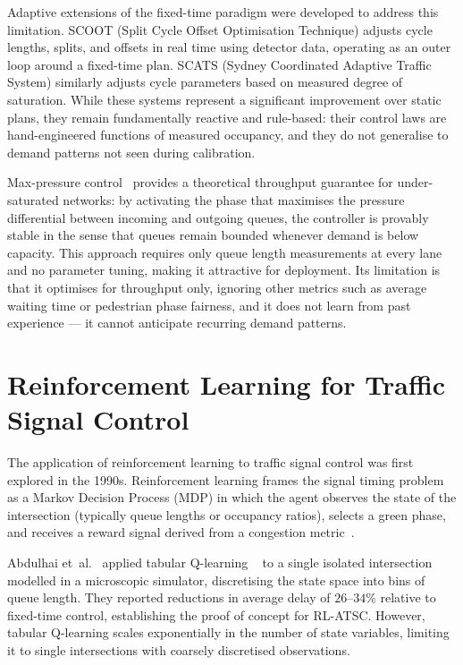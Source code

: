 \documentclass[12pt,oneside,a4paper]{report}
\begin{document}
Adaptive extensions of the fixed-time paradigm were developed to
address this limitation.  SCOOT (Split Cycle Offset Optimisation
Technique) adjusts cycle lengths, splits, and offsets in real time
using detector data, operating as an outer loop around a
fixed-time plan.  SCATS (Sydney Coordinated Adaptive Traffic System)
similarly adjusts cycle parameters based on measured degree of
saturation.  While these systems represent a significant improvement
over static plans, they remain fundamentally reactive and rule-based:
their control laws are hand-engineered functions of measured
occupancy, and they do not generalise to demand patterns not seen
during calibration.

Max-pressure control~\cite{varaiya2013,presslight2019} provides a theoretical
throughput guarantee for under-saturated networks: by activating the
phase that maximises the pressure differential between incoming and
outgoing queues, the controller is provably stable in the sense that
queues remain bounded whenever demand is below capacity.  This
approach requires only queue length measurements at every lane and
no parameter tuning, making it attractive for deployment.  Its
limitation is that it optimises for throughput only, ignoring other
metrics such as average waiting time or pedestrian phase fairness,
and it does not learn from past experience --- it cannot anticipate
recurring demand patterns.

\section{Reinforcement Learning for Traffic Signal Control}
\label{sec:lit_rl_early}

The application of reinforcement learning to traffic signal control
was first explored in the 1990s.  Reinforcement learning frames
the signal timing problem as a Markov Decision Process (MDP)
in which the agent observes the state of the intersection
(typically queue lengths or occupancy ratios), selects a green
phase, and receives a reward signal derived from a congestion
metric~\cite{sutton_barto2018}.

Abdulhai et~al.~\cite{abdulhai2003} applied tabular Q-learning
~\cite{qlearning1992} to a single isolated intersection modelled in
a microscopic simulator, discretising the state space into bins
of queue length.  They reported reductions in average delay of
$26$--$34\%$ relative to fixed-time control, establishing the
proof of concept for RL-ATSC.  However, tabular Q-learning scales
exponentially in the number of state variables, limiting it to
single intersections with coarsely discretised observations.
\end{document}
